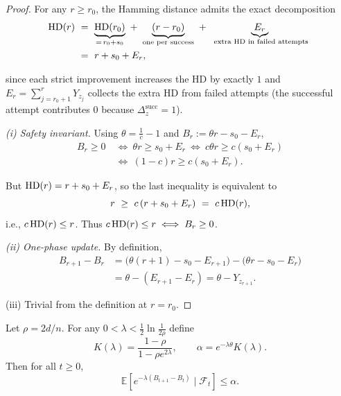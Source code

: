 \begin{proof}
	For any $r\ge r_0$, the Hamming distance admits the exact decomposition
	\begin{align*}
		\HD(r)\ &=\ \underbrace{\HD(r_0)}_{=\,r_0+s_0}\ +\ \underbrace{(r-r_0)}_{\text{one per success}}\ +\ \underbrace{E_r}_{\text{ extra HD in failed attempts}}
		\ \\&=\ r+s_0+E_r,		
	\end{align*}
	
	since each strict improvement increases the HD by exactly $1$ and $E_r=\sum_{j=r_0+1}^r Y_{z_j}$ collects the extra HD from failed attempts (the successful attempt contributes $0$ because $\Delta_z^{\mathrm{succ}}=1$).
	
	\smallskip
	\emph{(i) Safety invariant.}
	Using $\theta=\tfrac{1}{c}-1$ and $B_r:=\theta r - s_0 - E_r$,
	\begin{align*}
		B_r\ge 0
		\ &\Longleftrightarrow\
		\theta r \ge s_0+E_r
		\ \Longleftrightarrow\
		c\theta r \ge c(s_0+E_r)
		\\ &\Longleftrightarrow\
		(1-c)r \ge c(s_0+E_r).	
	\end{align*}
	
	
	But $\text{HD}(r)=r+s_0+E_r$, so the last inequality is equivalent to
	\[
	r \ \ge\ c\,(r+s_0+E_r)\ =\ c\,\HD(r),
	\]
	i.e., $c\,\text{HD}(r)\le r$. Thus $c\,\text{HD}(r)\le r \iff B_r\ge 0$.
	
	\smallskip
	\emph{(ii) One-phase update.}
	By definition,
	\begin{align*}
		B_{r+1}-B_r
		&= \bigl(\theta(r+1)-s_0-E_{r+1}\bigr) - \bigl(\theta r - s_0 - E_r\bigr)
		\\&= \theta - (E_{r+1}-E_r)
		= \theta - Y_{z_{r+1}}.
	\end{align*}
	
	
	
	\smallskip
	(iii) Trivial from the definition at $r=r_0$.
\end{proof}

\begin{lemma}
	Let $\rho=2d/n$.  
	For any $0<\lambda<\tfrac12\ln\tfrac{1}{2\rho}$ define
	\[
	K(\lambda)=\frac{1-\rho}{1-\rho e^{2\lambda}}, 
	\qquad 
	\alpha=e^{-\lambda\theta}K(\lambda).
	\]
	Then for all $t\ge0$,
	\[
	\mathbb{E}[e^{-\lambda(B_{t+1}-B_t)}\mid\mathcal{F}_t]\le \alpha.
	\]
\end{lemma}

